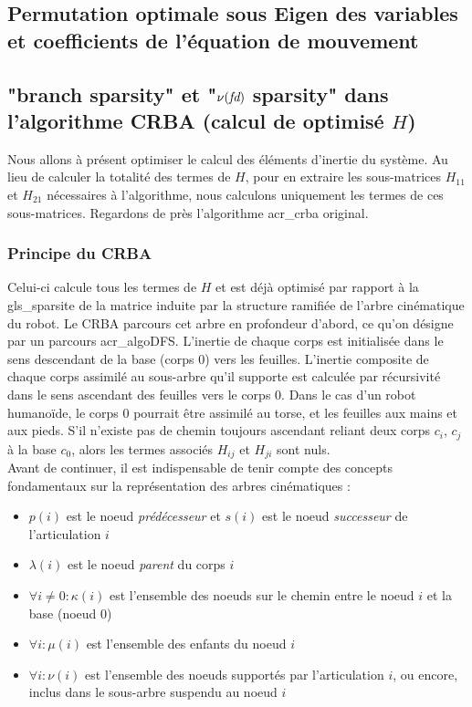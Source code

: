 \documentclass{report}
\begin{document}
\subsection{Permutation optimale sous Eigen des variables et coefficients de l'équation de mouvement}


\subsection{"branch sparsity" et "$\nu(\emph{fd})$ sparsity" dans l'algorithme CRBA (calcul de optimisé $H$)}

Nous allons à présent optimiser le calcul des éléments d'inertie du système. Au lieu de calculer la totalité des termes de $H$, pour en extraire les sous-matrices $H_{11}$ et $H_{21}$ nécessaires à l'algorithme, nous calculons uniquement les termes de ces sous-matrices. Regardons de près l'algorithme \gls{acr_crba} original.\\

\subsubsection{Principe du CRBA}
Celui-ci calcule tous les termes de $H$ et est déjà optimisé par rapport à la \gls{gls_sparsite} de la matrice induite par la structure ramifiée de l'arbre cinématique du robot. Le CRBA parcours cet arbre en profondeur d'abord, ce qu'on désigne par un parcours \gls{acr_algoDFS}. L'inertie de chaque corps est initialisée dans le sens descendant de la base (corps 0) vers les feuilles. L'inertie composite de chaque corps assimilé au sous-arbre qu'il supporte est calculée par récursivité dans le sens ascendant des feuilles vers le corps 0. Dans le cas d'un robot humanoïde, le corps 0 pourrait être assimilé au torse, et les feuilles aux mains et aux pieds. S'il n'existe pas de chemin toujours ascendant reliant deux corps $c_i$, $c_j$ à la base $c_0$, alors les termes associés $H_{ij}$ et $H_{ji}$ sont nuls.\\
Avant de continuer, il est indispensable de tenir compte des concepts fondamentaux sur la représentation des arbres cinématiques \cite[ch.4.1]{bib_featherstone}:

\begin{itemize}
\item $p(i)$ est le noeud \emph{prédécesseur} et $s(i)$ est le noeud \emph{successeur} de l'articulation $i$
\item $\lambda(i)$ est le noeud \emph{parent} du corps $i$
\item $\forall i \neq 0: \kappa(i)$ est l'ensemble des noeuds sur le chemin entre le noeud $i$ et la base (noeud $0$)
\item $\forall i: \mu (i)$  est l'ensemble des enfants du noeud $i$
\item $\forall i: \nu (i)$  est l'ensemble des noeuds supportés par l'articulation $i$, ou encore, inclus dans le sous-arbre suspendu au noeud $i$
\end{itemize}
\end{document}
